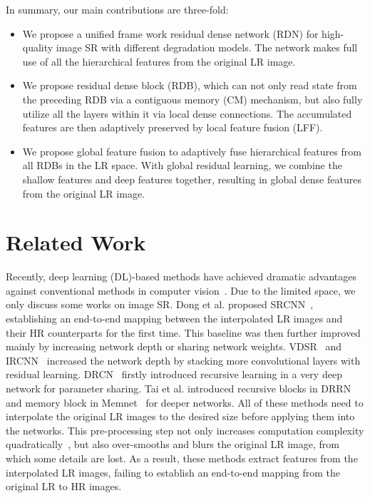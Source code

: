 \documentclass[10pt,twocolumn,letterpaper]{article}
\begin{document}
In summary, our main contributions are three-fold:
\begin{itemize}
\item We propose a unified frame work residual dense network (RDN) for high-quality image SR with different degradation models. The network makes full use of all the hierarchical features from the original LR image.
\end{itemize}
\begin{itemize}
\item We propose residual dense block (RDB), which can not only read state from the preceding RDB via a contiguous memory (CM) mechanism, but also fully utilize all the layers within it via local dense connections. The accumulated features are then adaptively preserved by local feature fusion (LFF).
\end{itemize}
\begin{itemize}
\item We propose global feature fusion to adaptively fuse hierarchical features from all RDBs in the LR space. With global residual learning, we combine the shallow features and deep features together, resulting in global dense features from the original LR image. 
\end{itemize}

\section{Related Work}
Recently, deep learning (DL)-based methods have achieved dramatic advantages against conventional methods in computer vision~\cite{zhang2017image,zhang2018density,zhang2018densely,li2018tell}. Due to the limited space, we only discuss some works on image SR. Dong et al. proposed SRCNN~\cite{dong2014learning}, establishing an end-to-end mapping between the interpolated LR images and their HR counterparts for the first time. This baseline was then further improved mainly by increasing network depth or sharing network weights. VDSR~\cite{kim2016accurate} and IRCNN~\cite{zhang2017learning} increased the network depth by stacking more convolutional layers with residual learning. DRCN~\cite{kim2016deeply} firstly introduced recursive learning in a very deep network for parameter sharing. Tai et al. introduced recursive blocks in DRRN~\cite{tai2017image} and memory block in Memnet~\cite{tai2017memnet} for deeper networks. All of these methods need to interpolate the original LR images to the desired size before applying them into the networks. This pre-processing step not only increases computation complexity quadratically~\cite{dong2016accelerating}, but also over-smooths and blurs the original LR image, from which some details are lost. As a result, these methods extract features from the interpolated LR images, failing to establish an end-to-end mapping from the original LR to HR images. 
\end{document}

